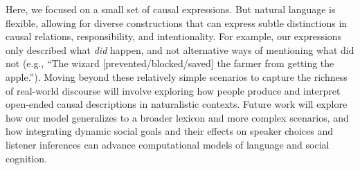 \documentclass[10pt,letterpaper]{article}
\begin{document}
Here, we focused on a small set of causal expressions. 
But natural language is flexible, allowing for diverse constructions that can express subtle distinctions in causal relations, responsibility, and intentionality.
For example, our expressions only described what \emph{did} happen, and not alternative ways of mentioning what did not (e.g., ``The wizard [prevented/blocked/saved] the farmer from getting the apple.'').
Moving beyond these relatively simple scenarios to capture the richness of real-world discourse will involve exploring how people produce and interpret open-ended causal descriptions in naturalistic contexts.
Future work will explore how our model generalizes to a broader lexicon and more complex scenarios, and how integrating dynamic social goals and their effects on speaker choices and listener inferences can advance computational models of language and social cognition.



\clearpage
\printbibliography
\end{document}
